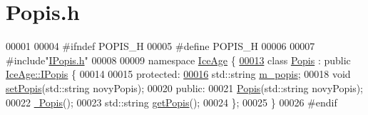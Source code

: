 \hypertarget{Popis_8h_source}{}\section{Popis.\+h}
\label{Popis_8h_source}

\begin{DoxyCode}
00001 
00004 \textcolor{preprocessor}{#ifndef POPIS\_H}
00005 \textcolor{preprocessor}{#define POPIS\_H}
00006 
00007 \textcolor{preprocessor}{#include"\hyperlink{IPopis_8h}{IPopis.h}"}
00008 
00009 \textcolor{keyword}{namespace }\hyperlink{namespaceIceAge}{IceAge} \{
\hypertarget{Popis_8h_source.tex_l00013}{}\hyperlink{classIceAge_1_1Popis}{00013}     \textcolor{keyword}{class }\hyperlink{classIceAge_1_1Popis}{Popis} : \textcolor{keyword}{public} \hyperlink{classIceAge_1_1IPopis}{IceAge::IPopis} \{
00014 
00015     \textcolor{keyword}{protected}:
\hypertarget{Popis_8h_source.tex_l00016}{}\hyperlink{classIceAge_1_1Popis_a1bde418d006647e86ca0811cacd0cd65}{00016}         std::string \hyperlink{classIceAge_1_1Popis_a1bde418d006647e86ca0811cacd0cd65}{m\_popis};
00018         \textcolor{keywordtype}{void} \hyperlink{classIceAge_1_1Popis_a9a1973711a1f7d5d533734f13813fcd9}{setPopis}(std::string novyPopis);
00020     \textcolor{keyword}{public}:
00021         \hyperlink{classIceAge_1_1Popis_a19cf552765d577e462b5c40ccc5ab7e1}{Popis}(std::string novyPopis);
00022         \hyperlink{classIceAge_1_1Popis_a3ba5866c6cbd58514918ea72790a5689}{~Popis}();
00023         std::string \hyperlink{classIceAge_1_1Popis_a64fb2b82bb634ebe8194484711ec22c1}{getPopis}();
00024     \};
00025 \}
00026 \textcolor{preprocessor}{#endif}
\end{DoxyCode}
